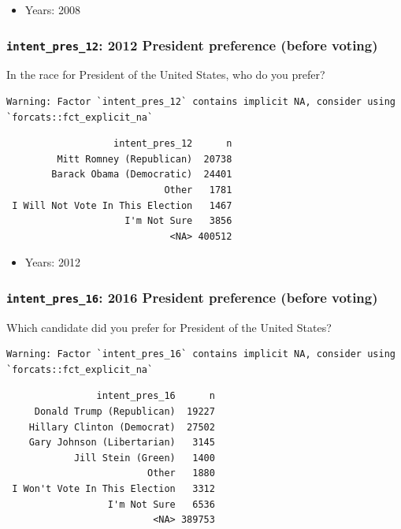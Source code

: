 \documentclass[10pt,article,oneside]{memoir}
\theoremstyle{definition}
\begin{document}
\begin{itemize}
\tightlist
\item
  Years: 2008
\end{itemize}

\hypertarget{intent_pres_12-2012-president-preference-before-voting}{%
\subsubsection{\texorpdfstring{\texttt{intent\_pres\_12}: 2012 President
preference (before
voting)}{intent\_pres\_12: 2012 President preference (before voting)}}\label{intent_pres_12-2012-president-preference-before-voting}}

In the race for President of the United States, who do you prefer?

\begin{verbatim}
Warning: Factor `intent_pres_12` contains implicit NA, consider using
`forcats::fct_explicit_na`
\end{verbatim}

\begin{verbatim}
                   intent_pres_12      n
         Mitt Romney (Republican)  20738
        Barack Obama (Democratic)  24401
                            Other   1781
 I Will Not Vote In This Election   1467
                     I'm Not Sure   3856
                             <NA> 400512
\end{verbatim}

\begin{itemize}
\tightlist
\item
  Years: 2012
\end{itemize}

\hypertarget{intent_pres_16-2016-president-preference-before-voting}{%
\subsubsection{\texorpdfstring{\texttt{intent\_pres\_16}: 2016 President
preference (before
voting)}{intent\_pres\_16: 2016 President preference (before voting)}}\label{intent_pres_16-2016-president-preference-before-voting}}

Which candidate did you prefer for President of the United States?

\begin{verbatim}
Warning: Factor `intent_pres_16` contains implicit NA, consider using
`forcats::fct_explicit_na`
\end{verbatim}

\begin{verbatim}
                intent_pres_16      n
     Donald Trump (Republican)  19227
    Hillary Clinton (Democrat)  27502
    Gary Johnson (Libertarian)   3145
            Jill Stein (Green)   1400
                         Other   1880
 I Won't Vote In This Election   3312
                  I'm Not Sure   6536
                          <NA> 389753
\end{verbatim}
\end{document}
